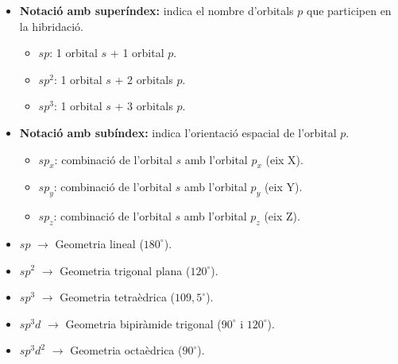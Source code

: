 \documentclass[12pt]{article}
\begin{document}
\begin{itemize}
    \item \textbf{Notació amb superíndex:} indica el nombre d'orbitals $p$ que participen en la hibridació.
    \begin{itemize}
        \item $sp$: 1 orbital $s$ + 1 orbital $p$.
        \item $sp^2$: 1 orbital $s$ + 2 orbitals $p$.
        \item $sp^3$: 1 orbital $s$ + 3 orbitals $p$.
    \end{itemize}

    \item \textbf{Notació amb subíndex:} indica l'orientació espacial de l'orbital $p$.
    \begin{itemize}
        \item $sp_x$: combinació de l'orbital $s$ amb l'orbital $p_x$ (eix X).
        \item $sp_y$: combinació de l'orbital $s$ amb l'orbital $p_y$ (eix Y).
        \item $sp_z$: combinació de l'orbital $s$ amb l'orbital $p_z$ (eix Z).
    \end{itemize}
\end{itemize}

\begin{itemize}
    \item $sp$ $\longrightarrow$ Geometria lineal ($180^\circ$).
    \item $sp^2$ $\longrightarrow$ Geometria trigonal plana ($120^\circ$).
    \item $sp^3$ $\longrightarrow$ Geometria tetraèdrica ($109{,}5^\circ$).
    \item $sp^3d$ $\longrightarrow$ Geometria bipiràmide trigonal ($90^\circ$ i $120^\circ$).
    \item $sp^3d^2$ $\longrightarrow$ Geometria octaèdrica ($90^\circ$).
\end{itemize}
\end{document}
